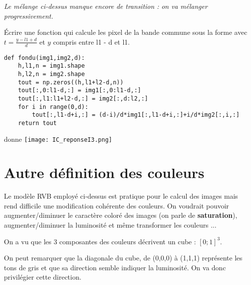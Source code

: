 \begin{Exercise}\it 
Le mélange ci-dessus manque encore de transition : on va mélanger progressivement.

Écrire une fonction   qui calcule les pixel de la bande commune sous la forme  avec  $t = \frac {y-l1+d} d$ et $y$ compris entre l1 - d et l1.
\end{Exercise}
\begin{Answer}
\begin{lstlisting}
def fondu(img1,img2,d):
    h,l1,n = img1.shape
    h,l2,n = img2.shape
    tout = np.zeros((h,l1+l2-d,n))
    tout[:,0:l1-d,:] = img1[:,0:l1-d,:]
    tout[:,l1:l1+l2-d,:] = img2[:,d:l2,:]
    for i in range(0,d):
        tout[:,l1-d+i,:] = (d-i)/d*img1[:,l1-d+i,:]+i/d*img2[:,i,:]
    return tout
\end{lstlisting}
\newpage
\end{Answer}
\begin{center}
 donne
\texttt{[image: IC\_reponseI3.png]} 
\end{center}
\newpage
\section{Autre définition des couleurs}
Le modèle RVB employé ci-dessus est pratique pour le calcul des images mais rend difficile une modification cohérente des couleurs. On voudrait pouvoir augmenter/diminuer le caractère coloré des images (on parle de {\bf saturation}), augmenter/diminuer la luminosité et même transformer les couleurs ...

On a vu que les 3 composantes des couleurs décrivent un cube : $[0;1]^3$.

On peut remarquer que la diagonale du cube, de (0,0,0) à (1,1,1) représente les tons de gris et que sa direction semble indiquer la luminosité.
On va donc privilégier cette direction.

